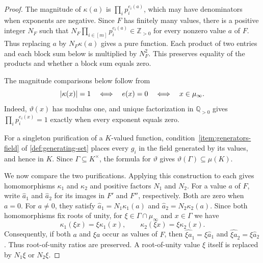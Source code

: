 \documentclass[11pt,letterpaper,onecolumn]{article}
\theoremstyle{plain}
\theoremstyle{definition}
\theoremstyle{remark}
\DeclarePairedDelimiter{\abs}{\lvert}{\rvert}
\begin{document}
\begin{proof}
The magnitude of $\kappa(a)$ is $\prod_i p_i^{e_i(a)}$, which may
have denominators when exponents are negative.  Since $F$ has finitely many values,
there is a positive integer $N_F$ such that
$N_F\prod_{i\in[m]}p_i^{e_i(a)}\in\mathbb Z_{>0}$ for every nonzero
value $a$ of $F$.
Thus replacing $a$ by $N_F\kappa(a)$ gives a pure function.
Each product of two entries and each block sum below is multiplied by
$N_F^2$.  This preserves equality of the products and whether a block
sum equals zero.

The magnitude comparisons below follow from
\begin{equation}
  \abs{\kappa(x)}=1
  \quad\Longleftrightarrow\quad
  e(x)=0
  \quad\Longleftrightarrow\quad
  x\in\mu_\infty.
  \label{eq:purification-unit-modulus}
\end{equation}
Indeed, $\vartheta(x)$ has modulus one, and unique factorization in
$\mathbb Q_{>0}$ gives $\prod_i p_i^{e_i(x)}=1$ exactly when every
exponent equals zero.

For a singleton purification of a $K$-valued function,
condition~\ref{item:generators-field} of \cref{def:generating-set}
places every $g_i$ in the field generated by its values,
and hence in $K$.
Since $\Gamma\subseteq K^\times$, the formula for $\vartheta$ gives
$\vartheta(\Gamma)\subseteq\mu(K)$.

We now compare the two purifications.
Applying this construction to each gives homomorphisms $\kappa_1$ and
$\kappa_2$ and positive factors $N_1$ and $N_2$.
For a value $a$ of $F$, write $\widehat a_1$ and $\widehat a_2$ for its
images in $F'$ and $F''$, respectively.  Both are zero when $a=0$.
For $a\ne0$, they satisfy $\widehat a_1=N_1\kappa_1(a)$ and
$\widehat a_2=N_2\kappa_2(a)$.
Since both homomorphisms fix roots of unity, for
$\xi\in\Gamma\cap\mu_\infty$ and $x\in\Gamma$ we have
\begin{equation}
  \kappa_1(\xi x)=\xi\kappa_1(x),
  \qquad
  \kappa_2(\xi x)=\xi\kappa_2(x).
  \label{eq:purification-torsion-covariance}
\end{equation}
Consequently, if both $a$ and $\xi a$ occur as values of $F$, then
$\widehat{\xi a}_{1}=\xi\widehat a_1$ and
$\widehat{\xi a}_{2}=\xi\widehat a_2$.
Thus root-of-unity ratios are preserved.  A root-of-unity value $\xi$
itself is replaced by $N_1\xi$ or $N_2\xi$.


\end{proof}
\end{document}
